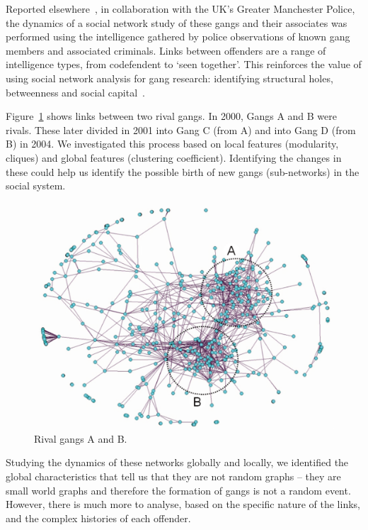 \documentclass[conference]{IEEEtran}
\theoremstyle{definition}
\begin{document}

Reported elsewhere~\cite{oatley+crick_asonam2014}, in collaboration
with the UK's Greater Manchester Police, the dynamics of a social
network study of these gangs and their associates was performed using
the intelligence gathered by police observations of known gang members
and associated criminals. Links between offenders are a range of
intelligence types, from codefendent to `seen together'. This
reinforces the value of using social network analysis for gang
research: identifying structural holes, betweenness and social
capital~\cite{papachristos:2006}.

Figure~\ref{fig:2000ganglabels} shows links between two rival gangs.  In
2000, Gangs A and B were rivals. These later divided in 2001 into Gang
C (from A) and into Gang D (from B) in 2004. We
investigated this process based on local features (modularity,
cliques) and global features (clustering coefficient). Identifying the
changes in these could help us identify the possible birth of new
gangs (sub-networks) in the social system.

\begin{figure}[!ht] 
\centering
\includegraphics[width=\columnwidth]{images/2000ganglabels}
\caption{Rival gangs A and B.}
\label{fig:2000ganglabels}
\end{figure}

Studying the dynamics of these networks globally and locally, we
identified the global characteristics that tell us that they are not
random graphs -- they are small world graphs and therefore the
formation of gangs is not a random event. However, there is much more
to analyse, based on the specific nature of the links, and the complex
histories of each offender.
\end{document}
